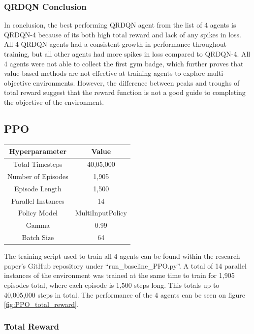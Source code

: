 \subsubsection*{QRDQN Conclusion}

In conclusion, the best performing QRDQN agent from the list of 4 agents is QRDQN-4 because of its both high total reward and lack of any spikes in loss. All 4 QRDQN agents had a consistent growth in performance throughout training, but all other agents had more spikes in loss compared to QRDQN-4. All 4 agents were not able to collect the first gym badge, which further proves that value-based methods are not effective at training agents to explore multi-objective environments. However, the difference between peaks and troughs of total reward suggest that the reward function is not a good guide to completing the objective of the environment.

\subsection{PPO}

\begin{center}
    \begin{tabular}{ |c|c| } 
     \hline
     Hyperparameter & Value \\ 
     \hline
     Total Timesteps & 40,05,000 \\
     Number of Episodes &  1,905 \\
     Episode Length & 1,500 \\ 
     Parallel Instances & 14 \\
     Policy Model & MultiInputPolicy \\
     Gamma & 0.99 \\  
     Batch Size & 64 \\
     \hline
    \end{tabular}
    \end{center}

The training script used to train all 4 agents can be found within the research paper's GitHub repository under ``run\_baseline\_PPO.py''. A total of 14 parallel instances of the environment was trained at the same time to train for 1,905 episodes total, where each episode is 1,500 steps long. This totals up to 40,005,000 steps in total. The performance of the 4 agents can be seen on figure \ref{fig:PPO_total_reward}. 

\subsubsection*{Total Reward}

